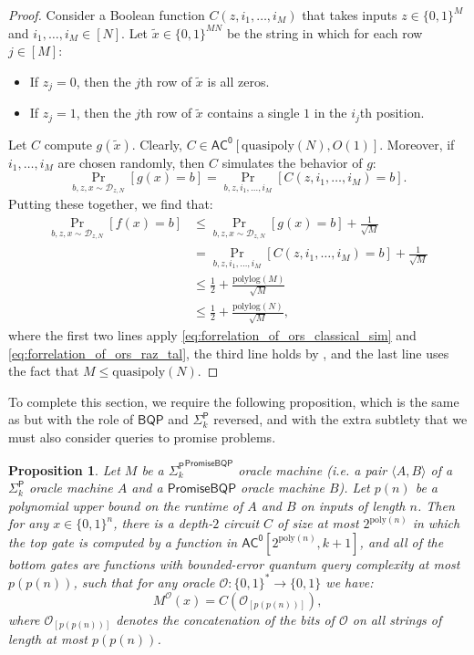 \documentclass[11pt]{article}%
\newtheorem{proposition}[theorem]{Proposition}
\newcommand{\poly}{\mathrm{poly}}
\newcommand{\polylog}{\mathrm{polylog}}
\newcommand{\quasipoly}{\mathrm{quasipoly}}
\begin{document}
\begin{proof}
Consider a Boolean function $C(z, i_1,\ldots,i_M)$ that takes inputs $z \in \{0,1\}^M$ and $i_1,\ldots,i_M \in [N]$. Let $\tilde{x} \in \{0,1\}^{MN}$ be the string in which for each row $j \in [M]$:
\begin{itemize}
\item If $z_j = 0$, then the $j$th row of $\tilde{x}$ is all zeros.
\item If $z_j = 1$, then the $j$th row of $\tilde{x}$ contains a single $1$ in the $i_j$th position.
\end{itemize}
Let $C$ compute $g(\tilde{x})$. Clearly, $C \in \mathsf{AC^0}[\quasipoly(N), O(1)]$. Moreover, if $i_1,\ldots,i_M$ are chosen randomly, then $C$ simulates the behavior of $g$:
\begin{equation}
\label{eq:forrelation_of_ors_raz_tal}
\Pr_{b,z,x \sim \mathcal{D}_{z,N}} \left[g(x) = b \right] = \Pr_{b,z,i_1,\ldots,i_M}\left[C(z, i_1,\ldots,i_M) = b\right].
\end{equation}
Putting these together, we find that:
\begin{align*}
\Pr_{b,z,x \sim \mathcal{D}_{z,N}} \left[f(x) = b \right] &\le \Pr_{b,z,x \sim \mathcal{D}_{z,N}} \left[g(x) = b \right] + \frac{1}{\sqrt{M}}\\
&= \Pr_{b,z,i_1,\ldots,i_M}\left[C(z, i_1,\ldots,i_M) = b\right] + \frac{1}{\sqrt{M}}\\
&\le \frac{1}{2} + \frac{\polylog(M)}{\sqrt{M}}\\
&\le \frac{1}{2} + \frac{\polylog(N)}{\sqrt{M}},
\end{align*}
where the first two lines apply \eqref{eq:forrelation_of_ors_classical_sim} and \eqref{eq:forrelation_of_ors_raz_tal}, the third line holds by , and the last line uses the fact that $M \le \quasipoly(N)$.
\end{proof}

To complete this section, we require the following proposition, which is the same as  but with the role of $\mathsf{BQP}$ and $\mathsf{\Sigma}_k^\mathsf{P}$ reversed, and with the extra subtlety that we must also consider queries to promise problems.

\begin{proposition}
\label{prop:fss_ph^promisebqp}
Let $M$ be a ${\mathsf{\Sigma}_k^\mathsf{P}}^\mathsf{PromiseBQP}$ oracle machine (i.e. a pair $\langle A, B \rangle$ of a $\mathsf{\Sigma}_k^\mathsf{P}$ oracle machine $A$ and a $\mathsf{PromiseBQP}$ oracle machine $B$). Let $p(n)$ be a polynomial upper bound on the runtime of $A$ and $B$ on inputs of length $n$. Then for any $x \in \{0,1\}^n$, there is a depth-$2$ circuit $C$ of size at most $2^{\poly(n)}$ in which the top gate is computed by a function in $\mathsf{AC^0}\left[2^{\poly(n)}, k+1\right]$, and all of the bottom gates are functions with bounded-error quantum query complexity at most $p(p(n))$, such that for any oracle $\mathcal{O}: \{0,1\}^* \to \{0,1\}$ we have:
\[
M^\mathcal{O}(x) = C\left( \mathcal{O}_{[p(p(n))]} \right),
\]
where $\mathcal{O}_{[p(p(n))]}$ denotes the concatenation of the bits of $\mathcal{O}$ on all strings of length at most $p(p(n))$.
\end{proposition}
\end{document}
